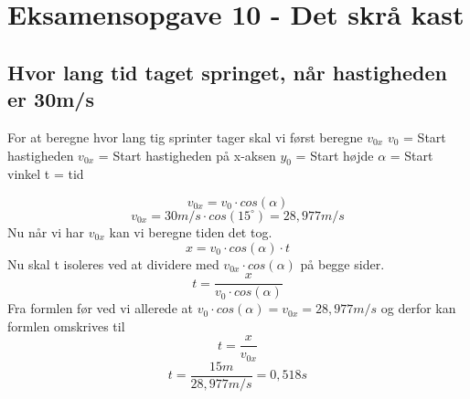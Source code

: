 \section{Eksamensopgave 10 - Det skrå kast}
\subsection{Hvor lang tid taget springet, når hastigheden er 30m/s}
For at beregne hvor lang tig sprinter tager skal vi først beregne \begin{math}v_{0x}\end{math}\newline
\begin{math}v_{0}\end{math} = Start hastigheden\newline
\begin{math}v_{0x}\end{math} = Start hastigheden på x-aksen\newline
\begin{math}y_{0}\end{math} = Start højde\newline
\begin{math}\alpha\end{math} = Start vinkel\newline
t = tid

\begin{equation*}
    v_{0x}=v_{0}\cdot cos(\alpha)
\end{equation*}
\begin{equation*}
    v_{0x}=30m/s\cdot cos(15^{\circ}) = 28,977 m/s
\end{equation*}
Nu når vi har \begin{math}v_{0x}\end{math} kan vi beregne tiden det tog.
\begin{equation*}
    x=v_{0}\cdot cos(\alpha)\cdot t
\end{equation*}
Nu skal t isoleres ved at dividere med \begin{math}v_{0x}\cdot cos(\alpha)\end{math} på begge sider.
\begin{equation*}
    t=\frac{x}{v_{0}\cdot cos(\alpha)}
\end{equation*}
Fra formlen før ved vi allerede at \begin{math}v_{0}\cdot cos(\alpha) = v_{0x} = 28,977m/s\end{math} og derfor kan formlen omskrives til
\begin{equation*}
    t=\frac{x}{v_{0x}}
\end{equation*}
\begin{equation*}
    t=\frac{15m}{28,977m/s} = 0,518 s
\end{equation*}



